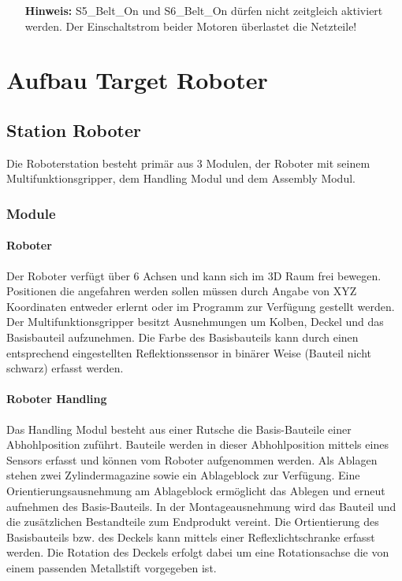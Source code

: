 \documentclass[11pt,a4paper,ngerman]{article}
\begin{document}
\begin{itemize}
	\item[\bf Hinweis:] S5\_Belt\_On und S6\_Belt\_On dürfen nicht zeitgleich aktiviert werden. Der Einschaltstrom beider Motoren überlastet die Netzteile!
\end{itemize}

\section{Aufbau Target Roboter}

\subsection{Station Roboter}
Die Roboterstation besteht primär aus 3 Modulen, der Roboter mit seinem Multifunktionsgripper, dem Handling Modul und dem Assembly Modul. 
\subsubsection{Module}
\paragraph{Roboter}
Der Roboter verfügt über 6 Achsen und kann sich im 3D Raum frei bewegen. Positionen die angefahren werden sollen müssen durch Angabe von XYZ Koordinaten entweder erlernt oder im Programm zur Verfügung gestellt werden. Der Multifunktionsgripper besitzt Ausnehmungen um Kolben, Deckel und das Basisbauteil aufzunehmen. Die Farbe des Basisbauteils kann durch einen entsprechend eingestellten Reflektionssensor in binärer Weise (Bauteil nicht schwarz) erfasst werden.

\paragraph{Roboter Handling}
Das Handling Modul besteht aus einer Rutsche die Basis-Bauteile einer Abhohlposition zuführt. Bauteile werden in dieser Abhohlposition mittels eines Sensors erfasst und können vom Roboter aufgenommen werden. Als Ablagen stehen zwei Zylindermagazine sowie ein Ablageblock zur Verfügung.\newline
Eine Orientierungsausnehmung am Ablageblock ermöglicht das Ablegen und erneut aufnehmen des Basis-Bauteils. In der Montageausnehmung wird das Bauteil und die zusätzlichen Bestandteile zum Endprodukt vereint. \newline
Die Ortientierung des Basisbauteils bzw. des Deckels kann mittels einer Reflexlichtschranke erfasst werden. Die Rotation des Deckels erfolgt dabei um eine Rotationsachse die von einem passenden Metallstift vorgegeben ist.
\end{document}
